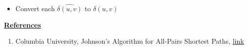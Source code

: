 \documentclass[12pt]{article}
\begin{document}
\begin{enumerate}[1.]
\begin{itemize}
\begin{enumerate}[1.]
\begin{itemize}
                \item Convert each $\hat{\delta(u,v)}$ to $\delta(u,v)$
            \end{itemize}

            \bigskip
        \end{enumerate}
    \end{itemize}

    \bigskip

    \underline{\textbf{References}}

    \bigskip

    \begin{enumerate}[1)]
        \item Columbia University, Johnson’s Algorithm for All-Pairs Shortest Paths, \href{http://www.columbia.edu/~cs2035/courses/ieor6614.S16/johnson.pdf}{link}
    \end{enumerate}


\end{enumerate}
\end{document}
